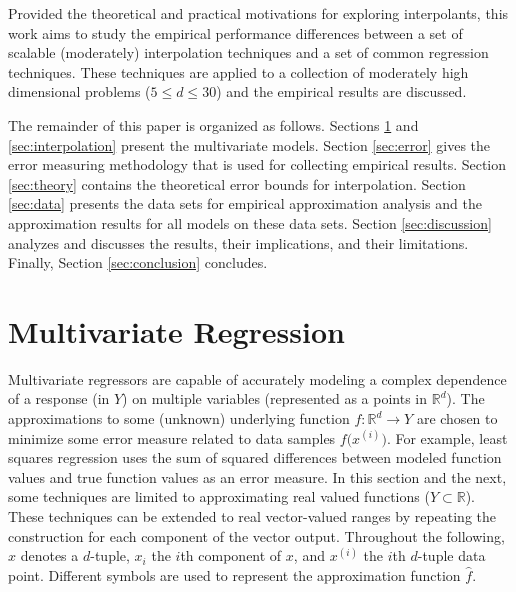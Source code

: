 \documentclass[smallextended,final]{svjour3}  %
\begin{document}
Provided the theoretical and practical motivations for exploring
interpolants, this work aims to study the empirical performance
differences between a set of scalable (moderately) interpolation
techniques and a set of common regression techniques. These techniques
are applied to a collection of moderately high dimensional problems
($5 \le d \le 30$) and the empirical results are discussed.

The remainder of this paper is organized as follows. Sections
\ref{sec:regression} and \ref{sec:interpolation} present the
multivariate models. Section \ref{sec:error} gives the error measuring
methodology that is used for collecting empirical results. Section
\ref{sec:theory} contains the theoretical error bounds for
interpolation. Section \ref{sec:data} presents the data sets for
empirical approximation analysis and the approximation results for all
models on these data sets. Section \ref{sec:discussion} analyzes and
discusses the results, their implications, and their
limitations. Finally, Section \ref{sec:conclusion} concludes.

\section{Multivariate Regression}
\label{sec:regression}
Multivariate regressors are capable of accurately modeling a complex
dependence of a response (in $Y$) on multiple variables (represented
as a points in $\mathbb{R}^{d}$). The approximations to some (unknown)
underlying function $f: \mathbb{R}^d \rightarrow Y$ are chosen to
minimize some error measure related to data samples
$f\bigl(x^{(i)}\bigr)$. For example, least squares regression uses the
sum of squared differences between modeled function values and true
function values as an error measure. In this section and the next,
some techniques are limited to approximating real valued functions ($Y
\subset \mathbb{R}$). These techniques can be extended to real
vector-valued ranges by repeating the construction for each component
of the vector output. Throughout the following, $x$ denotes a
$d$-tuple, $x_i$ the $i$th component of $x$, and $x^{(i)}$ the $i$th
$d$-tuple data point. Different symbols are used to represent the
approximation function $\hat f$.
\end{document}
